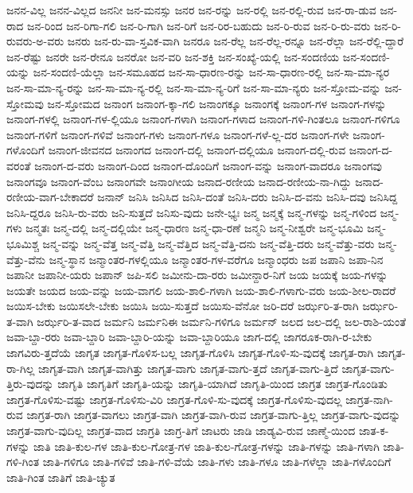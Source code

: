 {ಜನನ-ವಿಲ್ಲ
ಜನನ-ವಿಲ್ಲದ
ಜನನೀ
ಜನ-ಮನಸ್ಸು
ಜನರ
ಜನ-ರನ್ನು
ಜನ-ರಲ್ಲಿ
ಜನ-ರಲ್ಲಿ-ರುವ
ಜನ-ರಾ-ಡುವ
ಜನ-ರಾದ
ಜನ-ರಿಂದ
ಜನ-ರಿಗಾ-ಗಲಿ
ಜನ-ರಿ-ಗಾಗಿ
ಜನ-ರಿಗೆ
ಜನ-ರಿರ-ಬಹುದು
ಜನ-ರಿ-ರುವ
ಜನ-ರಿ-ರು-ವರು
ಜನ-ರಿ-ರುವರು-ಅ-ವರು
ಜನರು
ಜನ-ರು-ವಾ-ಸ್ತವಿಕ-ವಾಗಿ
ಜನರೂ
ಜನ-ರೆಲ್ಲ
ಜನ-ರೆಲ್ಲ-ರನ್ನೂ
ಜನ-ರೆಲ್ಲಾ
ಜನ-ರೆಲ್ಲಿ-ದ್ದಾರೆ
ಜನ-ರೆಷ್ಟು
ಜನರೇ
ಜನ-ರೇನೂ
ಜನರೋ
ಜನ-ವರಿ
ಜನ-ಶಕ್ತಿ
ಜನ-ಸಂಖ್ಯೆ-ಯಲ್ಲಿ
ಜನ-ಸಂದಣಿಯ
ಜನ-ಸಂದಣಿ-ಯನ್ನು
ಜನ-ಸಂದಣಿ-ಯೆಲ್ಲಾ
ಜನ-ಸಮೂಹದ
ಜನ-ಸಾ-ಧಾರಣ-ರನ್ನು
ಜನ-ಸಾ-ಧಾರಣ-ರಲ್ಲಿ
ಜನ-ಸಾ-ಮಾ-ನ್ಯರ
ಜನ-ಸಾ-ಮಾ-ನ್ಯ-ರನ್ನು
ಜನ-ಸಾ-ಮಾ-ನ್ಯ-ರಲ್ಲಿ
ಜನ-ಸಾ-ಮಾ-ನ್ಯ-ರಿಗೆ
ಜನ-ಸಾ-ಮಾ-ನ್ಯರು
ಜನ-ಸ್ತೋಮ-ವನ್ನು
ಜನ-ಸ್ತೋಮವು
ಜನ-ಸ್ತೋಮದ
ಜನಾಂಗ
ಜನಾಂಗ-ಕ್ಕಾ-ಗಲಿ
ಜನಾಂಗಕ್ಕೂ
ಜನಾಂಗಕ್ಕೆ
ಜನಾಂಗ-ಗಳ
ಜನಾಂಗ-ಗಳನ್ನು
ಜನಾಂಗ-ಗಳಲ್ಲಿ
ಜನಾಂಗ-ಗಳ-ಲ್ಲಿಯೂ
ಜನಾಂಗ-ಗಳಾಗಿ
ಜನಾಂಗ-ಗಳಾದ
ಜನಾಂಗ-ಗಳಿ-ಗಿಂತಲೂ
ಜನಾಂಗ-ಗಳಿಗೂ
ಜನಾಂಗ-ಗಳಿಗೆ
ಜನಾಂಗ-ಗಳಿವೆ
ಜನಾಂಗ-ಗಳು
ಜನಾಂಗ-ಗಳೂ
ಜನಾಂಗ-ಗಳೆ-ಲ್ಲ-ದರ
ಜನಾಂಗ-ಗಳೇ
ಜನಾಂಗ-ಗಳೊಂದಿಗೆ
ಜನಾಂಗ-ಜೀವನದ
ಜನಾಂಗದ
ಜನಾಂಗ-ದಲ್ಲಿ
ಜನಾಂಗ-ದಲ್ಲಿಯೂ
ಜನಾಂಗ-ದಲ್ಲಿ-ರುವ
ಜನಾಂಗ-ದ-ವರಂತೆ
ಜನಾಂಗ-ದ-ವರು
ಜನಾಂಗ-ದಿಂದ
ಜನಾಂಗ-ದೊಂದಿಗೆ
ಜನಾಂಗ-ವನ್ನು
ಜನಾಂಗ-ವಾದರೂ
ಜನಾಂಗವು
ಜನಾಂಗವೂ
ಜನಾಂಗ-ವೆಂಬ
ಜನಾಂಗವೇ
ಜನಾಂಗೀಯ
ಜನಾದ-ರಣೀಯ
ಜನಾದ-ರಣೀಯ-ನಾ-ಗಿದ್ದು
ಜನಾದ-ರಣೀಯ-ವಾಗ-ಬೇಕಾದರೆ
ಜನಾನ್
ಜನಿಸಿ
ಜನಿಸಿದ
ಜನಿಸಿ-ದಂತೆ
ಜನಿಸಿ-ದರು
ಜನಿಸಿ-ದ-ವನು
ಜನಿಸಿ-ದವು
ಜನಿಸಿದ್ದ
ಜನಿಸಿ-ದ್ದರೂ
ಜನಿಸಿ-ರು-ವರು
ಜನಿ-ಸುತ್ತದೆ
ಜನಿಸು-ವುದು
ಜನೇ-ಭ್ಯಃ
ಜನ್ಮ
ಜನ್ಮಕ್ಕೆ
ಜನ್ಮ-ಗಳನ್ನು
ಜನ್ಮ-ಗಳಿಂದ
ಜನ್ಮ-ಗಳು
ಜನ್ಮತಃ
ಜನ್ಮ-ದಲ್ಲಿ
ಜನ್ಮ-ದಲ್ಲಿಯೇ
ಜನ್ಮ-ಧಾರಣ
ಜನ್ಮ-ಧಾ-ರಣೆ
ಜನ್ಮನಿ
ಜನ್ಮ-ನೀಶ್ವರೇ
ಜನ್ಮ-ಭೂಮಿ
ಜನ್ಮ-ಭೂಮಿಶ್ಚ
ಜನ್ಮ-ವನ್ನು
ಜನ್ಮ-ವೆತ್ತ
ಜನ್ಮ-ವೆತ್ತಿ
ಜನ್ಮ-ವೆತ್ತಿದ
ಜನ್ಮ-ವೆತ್ತಿ-ದನು
ಜನ್ಮ-ವೆತ್ತಿ-ದರು
ಜನ್ಮ-ವೆತ್ತು-ವರು
ಜನ್ಮ-ವೆತ್ತು-ವೆನು
ಜನ್ಮ-ಸ್ಥಾನ
ಜನ್ಮಾಂತರ-ಗಳಲ್ಲಿಯೂ
ಜನ್ಮಾಂತರ-ಗಳ-ವರೆಗೂ
ಜನ್ಮಾಂಧರು
ಜಪ
ಜಪಾನಿ
ಜಪಾ-ನಿನ
ಜಪಾನೀ
ಜಪಾನೀ-ಯರು
ಜಪಾನ್
ಜಪಿ-ಸಲಿ
ಜಮೀನು-ದಾ-ರರು
ಜಮೀನ್ದಾರ-ನಿಗೆ
ಜಯ
ಜಯಕ್ಕೆ
ಜಯ-ಗಳನ್ನು
ಜಯತೇ
ಜಯದ
ಜಯ-ವನ್ನು
ಜಯ-ವಾಗಲಿ
ಜಯ-ಶಾಲಿ-ಗಳಾಗಿ
ಜಯ-ಶಾಲಿ-ಗಳಾಗು-ವರು
ಜಯ-ಶೀಲ-ರಾದರೆ
ಜಯಿಸ-ಬೇಕು
ಜಯಿಸಲೇ-ಬೇಕು
ಜಯಿಸಿ
ಜಯಿ-ಸುತ್ತದೆ
ಜಯಿಸು-ವೆನೋ
ಜರಿ-ದರೆ
ಜರ್ಝರಿ-ತ-ರಾಗಿ
ಜರ್ಝರಿ-ತ-ವಾಗಿ
ಜರ್ಝರಿ-ತ-ವಾದ
ಜರ್ಮನಿ
ಜರ್ಮನಿಈ
ಜರ್ಮನಿ-ಗಳಿಗೂ
ಜರ್ಮನ್
ಜಲದ
ಜಲ-ದಲ್ಲಿ
ಜಲ-ರಾಶಿ-ಯಂತೆ
ಜವಾ-ಬ್ದಾ-ರರು
ಜವಾ-ಬ್ದಾರಿ
ಜವಾ-ಬ್ದಾರಿ-ಯನ್ನು
ಜವಾ-ಬ್ದಾರಿಯೂ
ಜಾಗ-ದಲ್ಲಿ
ಜಾಗರೂಕ-ರಾಗಿ-ರ-ಬೇಕು
ಜಾಗವಿರು-ತ್ತದೆಯೆ
ಜಾಗೃತ
ಜಾಗೃತ-ಗೊಳಿಸ-ಬಲ್ಲ
ಜಾಗೃತ-ಗೊಳಿಸಿ
ಜಾಗೃತ-ಗೊಳಿ-ಸು-ವುದಕ್ಕೆ
ಜಾಗೃತ-ರಾಗಿ
ಜಾಗೃತ-ರಾ-ಗಿಲ್ಲ
ಜಾಗೃತ-ವಾಗಿ
ಜಾಗೃತ-ವಾಗಿತ್ತು
ಜಾಗೃತ-ವಾಗು
ಜಾಗೃತ-ವಾಗು-ತ್ತದೆ
ಜಾಗೃತ-ವಾಗು-ತ್ತಿದೆ
ಜಾಗೃತ-ವಾಗು-ತ್ತಿರು-ವುದನ್ನು
ಜಾಗೃತಿ
ಜಾಗೃತಿಗೆ
ಜಾಗೃತಿ-ಯನ್ನು
ಜಾಗೃತಿ-ಯಾಗಿದೆ
ಜಾಗೃತಿ-ಯಿಂದ
ಜಾಗ್ರತ
ಜಾಗ್ರತ-ಗೊಂಡಿತು
ಜಾಗ್ರತ-ಗೊಳಿಸು-ವಷ್ಟು
ಜಾಗ್ರತ-ಗೊಳಿಸು-ವಿರಿ
ಜಾಗ್ರತ-ಗೊಳಿ-ಸು-ವುದಕ್ಕೆ
ಜಾಗ್ರತ-ಗೊಳಿಸು-ವುದಲ್ಲ
ಜಾಗ್ರತ-ನಾಗಿ-ರುವ
ಜಾಗ್ರತ-ರಾಗಿ
ಜಾಗ್ರತ-ವಾಗಲು
ಜಾಗ್ರತ-ವಾಗಿ
ಜಾಗ್ರತ-ವಾಗಿ-ರುವ
ಜಾಗ್ರತ-ವಾಗು-ತ್ತಿಲ್ಲ
ಜಾಗ್ರತ-ವಾಗು-ವುದನ್ನು
ಜಾಗ್ರತ-ವಾಗು-ವುದಿಲ್ಲ
ಜಾಗ್ರತ-ವಾದ
ಜಾಗ್ರತಿ
ಜಾಗ್ರ-ತಿಗೆ
ಜಾಟರು
ಜಾಡಿ
ಜಾಡ್ಯವಿ-ರುವ
ಜಾಣ್ಮೆ-ಯಿಂದ
ಜಾತ-ಕ-ಗಳನ್ನು
ಜಾತಿ
ಜಾತಿ-ಕುಲ-ಗಳ
ಜಾತಿ-ಕುಲ-ಗೋತ್ರ-ಗಳ
ಜಾತಿ-ಕುಲ-ಗೋತ್ರ-ಗಳನ್ನು
ಜಾತಿ-ಗಳನ್ನು
ಜಾತಿ-ಗಳಾಗಿ
ಜಾತಿ-ಗಳಿ-ಗಿಂತ
ಜಾತಿ-ಗಳಿಗೂ
ಜಾತಿ-ಗಳಿವೆ
ಜಾತಿ-ಗಳಿ-ವೆಯೆ
ಜಾತಿ-ಗಳು
ಜಾತಿ-ಗಳೂ
ಜಾತಿ-ಗಳೆಲ್ಲಾ
ಜಾತಿ-ಗಳೊಂದಿಗೆ
ಜಾತಿ-ಗಿಂತ
ಜಾತಿಗೆ
ಜಾತಿ-ಚ್ಯುತ
}
